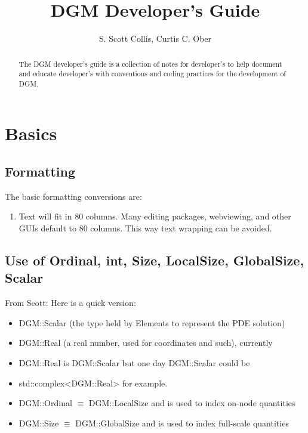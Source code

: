 \documentclass{report}
\begin{document}
\title{DGM Developer's Guide}


\author{S. Scott Collis, Curtis C. Ober}
\maketitle
\begin{abstract}
The DGM developer's guide is a collection of notes for developer's to
help document and educate developer's with conventions and coding practices
for the development of DGM.
\end{abstract}

\chapter{Basics}

\section{Formatting}

The basic formatting conversions are:
\begin{enumerate}
  \item Text will fit in 80 columns.  Many editing packages, webviewing,
        and other GUIs default to 80 columns.  This way text wrapping
        can be avoided.
\end{enumerate}

\section{Use of Ordinal, int, Size, LocalSize, GlobalSize, Scalar}

From Scott: Here is a quick version:

\begin{itemize}
  \item DGM::Scalar (the type held by Elements to represent the PDE solution)
  \item DGM::Real (a real number, used for coordinates and such), currently
  \item DGM::Real is DGM::Scalar but one day DGM::Scalar could be
  \item std::complex<DGM::Real> for example.
  \item DGM::Ordinal $\equiv$ DGM::LocalSize and is used to index on-node
        quantities
  \item DGM::Size $\equiv$ DGM::GlobalSize and is used to index full-scale
        quantities
\end{itemize}
\end{document}
